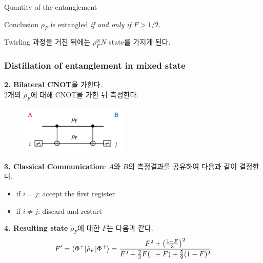 \documentclass[9pt]{beamer}
\begin{document}
\begin{section}{Quantity of the entanglement}
\begin{frame}
            \begin{block}{Conclusion}
                $\rho_F$ is entangled \textit{if and only if} $F > 1/2$.
            \end{block}
            
            Twirling 과정을 거친 뒤에는 $\rho_F^\otimes N$ state를 가지게 된다.
        \end{frame}

        \begin{frame}
            \frametitle{Distillation of entanglement in mixed state}
            \textbf{2. Bilateral CNOT}을 가한다.\\
            2개의 $\rho_F$에 대해 CNOT을 가한 뒤 측정한다.\\
            \begin{figure}
                \centering
                \includegraphics[width=0.45\textwidth]{image/L7_measure.png}
            \end{figure}
            \textbf{3. Classical Communication}: $A$와 $B$의 측정결과를 공유하여 다음과 같이 결정한다.
            \begin{itemize}
                \item if $i=j$: accept the first register
                \item if $i\ne j$: discard and restart
            \end{itemize}
            \textbf{4. Resulting state} $\tilde \rho_F$에 대한 $F$는 다음과 같다.
            \begin{equation*}
                F' = \braket{\Phi^+|\tilde \rho_F | \Phi^+} = \frac{F^2 + \left(\frac{1-F}{3}\right)^2}{F^2 + \frac{2}{3} F(1-F) + \frac{5}{9} (1-F)^2}
            \end{equation*}
        \end{frame}


\end{section}
\end{document}
